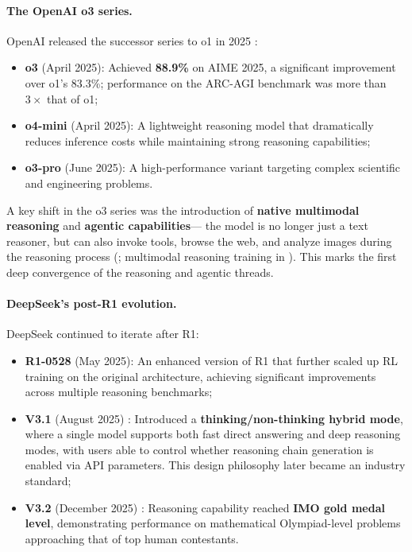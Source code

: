 \paragraph{The OpenAI o3 series.}
OpenAI released the successor series to o1 in 2025 \cite{openai2025o3}:
\begin{itemize}[leftmargin=2em]
  \item \textbf{o3} (April 2025): Achieved \textbf{88.9\%} on AIME 2025,
    a significant improvement over o1's 83.3\%;
    performance on the ARC-AGI benchmark was more than $3\times$ that of o1;
  \item \textbf{o4-mini} (April 2025): A lightweight reasoning model
    that dramatically reduces inference costs while maintaining strong reasoning capabilities;
  \item \textbf{o3-pro} (June 2025): A high-performance variant targeting complex scientific and engineering problems.
\end{itemize}
A key shift in the o3 series was the introduction of \textbf{native multimodal reasoning} and \textbf{agentic capabilities}---
the model is no longer just a text reasoner, but can also invoke tools, browse the web, and analyze images during the reasoning process
(; multimodal reasoning training in ).
This marks the first deep convergence of the reasoning and agentic threads.

\paragraph{DeepSeek's post-R1 evolution.}
DeepSeek continued to iterate after R1:
\begin{itemize}[leftmargin=2em]
  \item \textbf{R1-0528} (May 2025): An enhanced version of R1
    that further scaled up RL training on the original architecture,
    achieving significant improvements across multiple reasoning benchmarks;
  \item \textbf{V3.1} (August 2025) \cite{deepseek2024v3}:
    Introduced a \textbf{thinking/non-thinking hybrid mode},
    where a single model supports both fast direct answering and deep reasoning modes,
    with users able to control whether reasoning chain generation is enabled via API parameters.
    This design philosophy later became an industry standard;
  \item \textbf{V3.2} (December 2025) \cite{deepseek2025v32}:
    Reasoning capability reached \textbf{IMO gold medal level},
    demonstrating performance on mathematical Olympiad-level problems approaching that of top human contestants.
\end{itemize}

